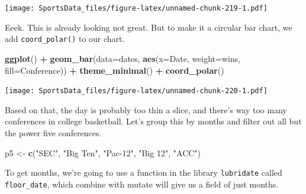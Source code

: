 \documentclass[]{book}
\newenvironment{Shaded}{\begin{snugshade}}{\end{snugshade}}
\newcommand{\DataTypeTok}[1]{\textcolor[rgb]{0.13,0.29,0.53}{#1}}
\newcommand{\KeywordTok}[1]{\textcolor[rgb]{0.13,0.29,0.53}{\textbf{#1}}}
\newcommand{\NormalTok}[1]{#1}
\newcommand{\OperatorTok}[1]{\textcolor[rgb]{0.81,0.36,0.00}{\textbf{#1}}}
\newcommand{\StringTok}[1]{\textcolor[rgb]{0.31,0.60,0.02}{#1}}
\begin{document}
\texttt{[image: SportsData\_files/figure-latex/unnamed-chunk-219-1.pdf]}

Eeek. This is already looking not great. But to make it a circular bar chart, we add \texttt{coord\_polar()} to our chart.

\begin{Shaded}
\begin{Highlighting}[]
\KeywordTok{ggplot}\NormalTok{() }\OperatorTok{+}\StringTok{ }\KeywordTok{geom_bar}\NormalTok{(}\DataTypeTok{data=}\NormalTok{dates, }\KeywordTok{aes}\NormalTok{(}\DataTypeTok{x=}\NormalTok{Date, }\DataTypeTok{weight=}\NormalTok{wins, }\DataTypeTok{fill=}\NormalTok{Conference)) }\OperatorTok{+}\StringTok{ }\KeywordTok{theme_minimal}\NormalTok{() }\OperatorTok{+}\StringTok{ }\KeywordTok{coord_polar}\NormalTok{()}
\end{Highlighting}
\end{Shaded}

\texttt{[image: SportsData\_files/figure-latex/unnamed-chunk-220-1.pdf]}

Based on that, the day is probably too thin a slice, and there's way too many conferences in college basketball. Let's group this by months and filter out all but the power five conferences.

\begin{Shaded}
\begin{Highlighting}[]
\NormalTok{p5 <-}\StringTok{ }\KeywordTok{c}\NormalTok{(}\StringTok{"SEC"}\NormalTok{, }\StringTok{"Big Ten"}\NormalTok{, }\StringTok{"Pac-12"}\NormalTok{, }\StringTok{"Big 12"}\NormalTok{, }\StringTok{"ACC"}\NormalTok{)}
\end{Highlighting}
\end{Shaded}

To get months, we're going to use a function in the library \texttt{lubridate} called \texttt{floor\_date}, which combine with mutate will give us a field of just months.

\begin{Shaded}
\end{Shaded}
\end{document}
